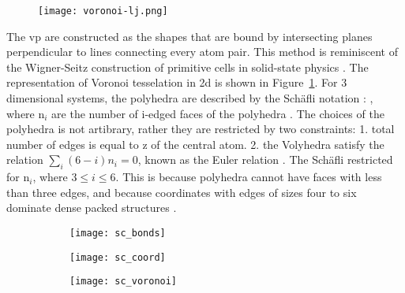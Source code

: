 \begin{figure}[h] \centering
	\texttt{[image: voronoi-lj.png]}
	\label{f:ljvoro}
\end{figure}

The \gls{vp} are constructed as the shapes that are bound by intersecting planes perpendicular to lines connecting every atom pair. This method is reminiscent of the Wigner-Seitz construction of primitive cells in solid-state physics \cite{Kittel2004}. The representation of Voronoi tesselation in \gls{2d} is shown in Figure~\ref{f:ljvoro}. For 3 dimensional systems, the polyhedra are described by the Sch\"afli notation \cite{Coxeter1973}: , where n$_i$ are the number of i-edged faces of the polyhedra \cite{Coxeter1973,Brostow1998}. The choices of the polyhedra is not artibrary, rather they are restricted by two constraints: 1. total number of edges is equal to \gls{z} of the central atom. 2. the Volyhedra satisfy the relation $\sum _i (6-i)n_i = 0$, known as the Euler relation \cite{Finney1970}. The   Sch\"afli restricted for n$_i$, where $3 \leq i \leq 6$. This is because polyhedra cannot have faces with less than three edges, and because coordinates with edges of sizes four to six dominate dense packed structures \cite{Borodin1999}. \par

\begin{figure}
	\begin{subfigure}{0.33\textwidth}	 \centering		\texttt{[image: sc\_bonds]} 
		 \end{subfigure}%
	\hfill
	\begin{subfigure}{0.33\textwidth}	\centering  	\texttt{[image: sc\_coord]}
	 \end{subfigure}%
	\hfill
	\begin{subfigure}{0.33\textwidth}	\centering  	 \texttt{[image: sc\_voronoi]} 
		  \end{subfigure}%
	\label{f:voronoi-sch}
\end{figure}

